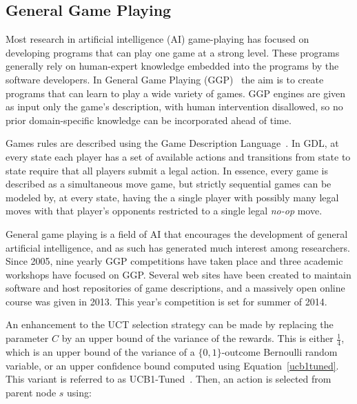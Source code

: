 
\subsection{General Game Playing}

Most research in artificial intelligence (AI) game-playing has focused on developing programs that can play one
game at a strong level. These programs 
generally rely on human-expert knowledge embedded into the programs by the software developers. In General Game Playing 
(GGP)~\cite{Genesereth05GGP} the aim is to create programs that can learn to play a wide variety of games. 
GGP engines are given as input only the game's description, with
human intervention disallowed, so no prior domain-specific knowledge can be incorporated ahead of time.

Games rules are described using the Game Description Language~\cite{Love08GDL}. In GDL, at every state each player has 
a set of available actions and transitions from state to state require that all players submit a legal action. In essence, 
every game is described as a simultaneous move game, but strictly sequential games can be modeled by, at every state, 
having the a single player with possibly many legal moves with that player's opponents restricted to a single legal 
\textit{no-op} move. 
 
General game playing is a field of AI that encourages the development of general artificial intelligence, and as such
has generated much interest among researchers. 
Since 2005, nine yearly GGP competitions have taken place and three academic workshops have focused on GGP. 
Several web sites have been created to maintain software and host repositories of game descriptions, and 
a massively open online course was given in 2013. This year's competition is set for summer of 2014. 



%
%

An enhancement to the UCT selection strategy can be made by replacing the parameter $C$ by an upper bound of the variance of 
the rewards. This is either $\frac{1}{4}$, which is an upper bound of the variance of a $\{0,1\}$-outcome Bernoulli
random variable, or an upper confidence bound computed using Equation~\ref{ucb1tuned}. 
This variant is referred to as UCB1-Tuned~\cite{Auer02Finite}. Then, an action is selected from parent 
node $s$ using:

